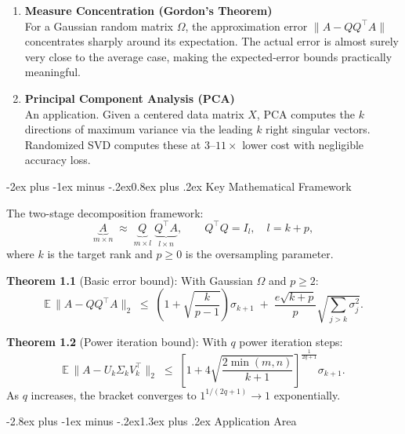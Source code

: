 \documentclass[12pt,a4paper]{article}
\makeatletter
\renewcommand{\section}{\@startsection{section}{1}{\z@}
  {-2.8ex plus -1ex minus -.2ex}{1.3ex plus .2ex}
  {\large\bfseries\color{deepblue}}}
\renewcommand{\subsection}{\@startsection{subsection}{2}{\z@}
  {-2ex plus -1ex minus -.2ex}{0.8ex plus .2ex}
  {\normalsize\bfseries\color{deepblue}}}
\makeatother
\begin{document}
\begin{enumerate}[leftmargin=1.8em, itemsep=4pt]
  \item \textbf{Measure Concentration (Gordon's Theorem)}\\
    For a Gaussian random matrix $\Omega$, the approximation error $\|A - QQ^\top A\|$
    concentrates sharply around its expectation. The actual error is almost surely very
    close to the average case, making the expected-error bounds practically meaningful.

  \item \textbf{Principal Component Analysis (PCA)}\\
    An application. Given a centered data matrix $X$, PCA computes the $k$ directions
    of maximum variance via the leading $k$ right singular vectors. Randomized SVD
    computes these at $3$--$11\times$ lower cost with negligible accuracy loss.
\end{enumerate}

\subsection{Key Mathematical Framework}

The two-stage decomposition framework:
\[
\underbrace{A}_{m \times n}
\;\approx\;
\underbrace{Q}_{m \times l}\;
\underbrace{Q^\top A}_{l \times n},
\qquad Q^\top Q = I_l, \quad l = k + p,
\]
where $k$ is the target rank and $p \geq 0$ is the oversampling parameter.

\textbf{Theorem 1.1} (Basic error bound): With Gaussian $\Omega$ and $p \geq 2$:
\[
\mathbb{E}\,\|A - QQ^\top A\|_2
\;\leq\; \left(1 + \sqrt{\frac{k}{p-1}}\right)\sigma_{k+1}
\;+\; \frac{e\sqrt{k+p}}{p}\sqrt{\sum_{j>k}\sigma_j^2}.
\]

\textbf{Theorem 1.2} (Power iteration bound): With $q$ power iteration steps:
\[
\mathbb{E}\,\|A - U_k\Sigma_k V_k^\top\|_2
\;\leq\;
\left[1 + 4\sqrt{\frac{2\min(m,n)}{k+1}}\right]^{\!\frac{1}{2q+1}} \sigma_{k+1}.
\]
As $q$ increases, the bracket converges to $1^{1/(2q+1)} \to 1$ exponentially.

\section{Application Area}
\end{document}

